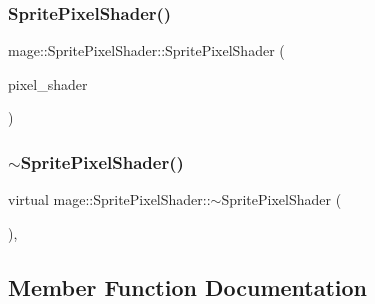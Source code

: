 \hypertarget{classmage_1_1_sprite_pixel_shader_a2ec1a47d5ada6e2e319605108f971d0c}{}\label{classmage_1_1_sprite_pixel_shader_a2ec1a47d5ada6e2e319605108f971d0c} 
\subsubsection{\texorpdfstring{Sprite\+Pixel\+Shader()}{SpritePixelShader()}\hspace{0.1cm}{\footnotesize\ttfamily [3/3]}}
{\footnotesize\ttfamily mage\+::\+Sprite\+Pixel\+Shader\+::\+Sprite\+Pixel\+Shader (\begin{DoxyParamCaption}\item[{\hyperlink{classmage_1_1_sprite_pixel_shader}{Sprite\+Pixel\+Shader} \&\&}]{pixel\+\_\+shader }\end{DoxyParamCaption})\hspace{0.3cm}{\ttfamily [default]}}

\hypertarget{classmage_1_1_sprite_pixel_shader_af7d6fd20a491855f8dfd2aef5e6294c4}{}\label{classmage_1_1_sprite_pixel_shader_af7d6fd20a491855f8dfd2aef5e6294c4} 
\subsubsection{\texorpdfstring{$\sim$\+Sprite\+Pixel\+Shader()}{~SpritePixelShader()}}
{\footnotesize\ttfamily virtual mage\+::\+Sprite\+Pixel\+Shader\+::$\sim$\+Sprite\+Pixel\+Shader (\begin{DoxyParamCaption}{ }\end{DoxyParamCaption})\hspace{0.3cm}{\ttfamily [virtual]}, {\ttfamily [default]}}



\subsection{Member Function Documentation}
\hypertarget{classmage_1_1_sprite_pixel_shader_adf6e6f0872406b9df46cb87731ed1ae0}{}\label{classmage_1_1_sprite_pixel_shader_adf6e6f0872406b9df46cb87731ed1ae0} 
